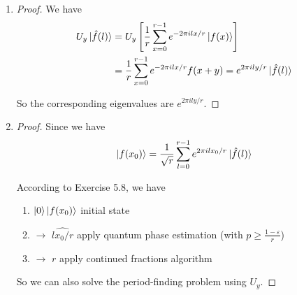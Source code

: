 \documentclass[../main.tex]{subfiles}
\begin{document}
\bigskip
\begin{exercise}
\end{exercise}
\begin{enumerate}
    \item \begin{proof}
    We have
    \begin{align*}
        U_y\ket{\hat{f}(l)} 
        &= U_y\left[\frac{1}{r}\sum_{x=0}^{r-1}e^{-2\pi i l x/r}\ket{f(x)}\right]\\
        &= \frac{1}{r}\sum_{x=0}^{r-1}e^{-2\pi i l x/r}f(x+y)=e^{2\pi i l y/r}\ket{\hat{f}(l)}
    \end{align*}
    
    So the corresponding eigenvalues are $e^{2\pi i l y/r}$.
    \end{proof}
    
    \item \begin{proof}
    Since we have
    \[ 
        \ket{f(x_0)}=\frac{1}{\sqrt{r}}\sum_{l=0}^{r-1}e^{2\pi i l x_0/r}\ket{\hat{f}(l)}
    \]
    
    According to Exercise 5.8, we have
    \begin{mdframed}
    \begin{enumerate}[label=(\arabic*)]
        \item \quad $\ket{0}\ket{f(x_0)}$ \tabto{4cm} initial state
        \item \quad $\to$ $\widehat{l x_0/r}$ \tabto{4cm} apply quantum phase estimation (with $p\geq\frac{1-\varepsilon}{r}$)
        \item \quad $\to$ $r$ \tabto{4cm} apply continued fractions algorithm
    \end{enumerate}
    \end{mdframed}
    
    So we can also solve the period-finding problem using $U_y$.
    \end{proof}
\end{enumerate}
\end{document}
